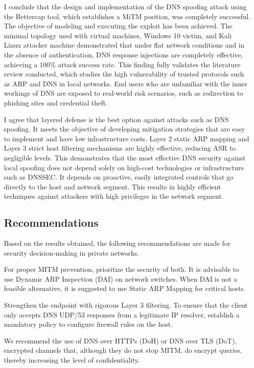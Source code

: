 \documentclass[conference]{IEEEtran}
\begin{document}
I conclude that the design and implementation of the DNS spoofing attack using the Bettercap tool, which establishes a MiTM position, was completely successful. The objective of modeling and executing the exploit has been achieved. The minimal topology used with virtual machines, Windows 10 victim, and Kali Linux attacker machine demonstrated that under flat network conditions and in the absence of authentication, DNS response injections are completely effective, achieving a 100\% attack success rate. This finding fully validates the literature review conducted, which studies the high vulnerability of trusted protocols such as ARP and DNS in local networks. End users who are unfamiliar with the inner workings of DNS are exposed to real-world risk scenarios, such as redirection to phishing sites and credential theft.


I agree that layered defense is the best option against attacks such as DNS spoofing. It meets the objective of developing mitigation strategies that are easy to implement and have low infrastructure costs. Layer 2 static ARP mapping and Layer 3 strict host filtering mechanisms are highly effective, reducing ASR to negligible levels. This demonstrates that the most effective DNS security against local spoofing does not depend solely on high-cost technologies or infrastructure such as DNSSEC. It depends on proactive, easily integrated controls that go directly to the host and network segment. This results in highly efficient techniques against attackers with high privileges in the network segment.

\subsection{Recommendations}
Based on the results obtained, the following recommendations are made for security decision-making in private networks.

For proper MITM prevention, prioritize the security of both.  It is advisable to use Dynamic ARP Inspection (DAI) on network switches.  When DAI is not a feasible alternative, it is suggested to use Static ARP Mapping for critical hosts.

Strengthen the endpoint with rigorous Layer 3 filtering. To ensure that the client only accepts DNS UDP/53 responses from a legitimate IP resolver, establish a mandatory policy to configure firewall rules on the host.

We recommend the use of DNS over HTTPs (DoH) or DNS over TLS (DoT), encrypted channels that, although they do not stop MITM, do encrypt queries, thereby increasing the level of confidentiality.
\end{document}
